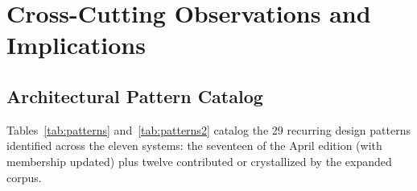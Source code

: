 \documentclass[11pt,a4paper]{article}
\begin{document}
\section{Cross-Cutting Observations and Implications}
\label{sec:synthesis}

\subsection{Architectural Pattern Catalog}

Tables~\ref{tab:patterns} and~\ref{tab:patterns2} catalog the 29 recurring design patterns identified across the eleven systems: the seventeen of the April edition (with membership updated) plus twelve contributed or crystallized by the expanded corpus.
\end{document}
